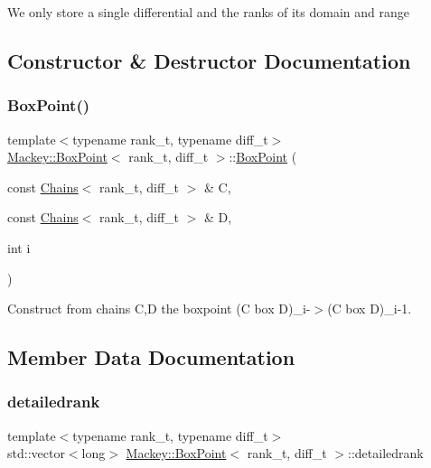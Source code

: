 We only store a single differential and the ranks of its domain and range 

\subsection{Constructor \& Destructor Documentation}
\mbox{\label{classMackey_1_1BoxPoint_a7d7864d6623adb228897cb2d42594900}} 
\subsubsection{\texorpdfstring{Box\+Point()}{BoxPoint()}}
{\footnotesize\ttfamily template$<$typename rank\+\_\+t, typename diff\+\_\+t$>$ \\
\hyperlink{classMackey_1_1BoxPoint}{Mackey\+::\+Box\+Point}$<$ rank\+\_\+t, diff\+\_\+t $>$\+::\hyperlink{classMackey_1_1BoxPoint}{Box\+Point} (\begin{DoxyParamCaption}\item[{const \hyperlink{classMackey_1_1Chains}{Chains}$<$ rank\+\_\+t, diff\+\_\+t $>$ \&}]{C,  }\item[{const \hyperlink{classMackey_1_1Chains}{Chains}$<$ rank\+\_\+t, diff\+\_\+t $>$ \&}]{D,  }\item[{int}]{i }\end{DoxyParamCaption})\hspace{0.3cm}{\ttfamily [inline]}}



Construct from chains C,D the boxpoint (C box D)\+\_\+i-\/$>$(C box D)\+\_\+i-\/1. 



\subsection{Member Data Documentation}
\mbox{\label{classMackey_1_1BoxPoint_abe386801d835d806f74ee219070d2b80}} 
\subsubsection{\texorpdfstring{detailedrank}{detailedrank}}
{\footnotesize\ttfamily template$<$typename rank\+\_\+t, typename diff\+\_\+t$>$ \\
std\+::vector$<$long$>$ \hyperlink{classMackey_1_1BoxPoint}{Mackey\+::\+Box\+Point}$<$ rank\+\_\+t, diff\+\_\+t $>$\+::detailedrank}



